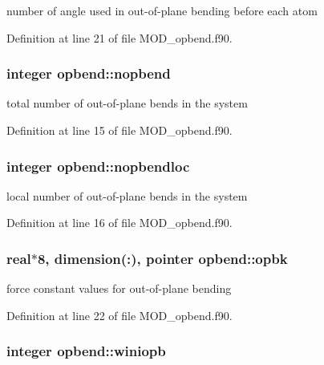 number of angle used in out-\/of-\/plane bending before each atom 



Definition at line 21 of file M\-O\-D\-\_\-opbend.\-f90.

\hypertarget{classopbend_ad0f7b4a83e73f1dc6ff0c96122c2cc83}{
\subsubsection[{nopbend}]{\setlength{\rightskip}{0pt plus 5cm}integer opbend\-::nopbend}}\label{classopbend_ad0f7b4a83e73f1dc6ff0c96122c2cc83}


total number of out-\/of-\/plane bends in the system 



Definition at line 15 of file M\-O\-D\-\_\-opbend.\-f90.

\hypertarget{classopbend_a835913f8c85f8b8af5bd6299d3ff7b1f}{
\subsubsection[{nopbendloc}]{\setlength{\rightskip}{0pt plus 5cm}integer opbend\-::nopbendloc}}\label{classopbend_a835913f8c85f8b8af5bd6299d3ff7b1f}


local number of out-\/of-\/plane bends in the system 



Definition at line 16 of file M\-O\-D\-\_\-opbend.\-f90.

\hypertarget{classopbend_a213b344234ce31a51b65aa619612a1ad}{
\subsubsection[{opbk}]{\setlength{\rightskip}{0pt plus 5cm}real$\ast$8, dimension(\-:), pointer opbend\-::opbk}}\label{classopbend_a213b344234ce31a51b65aa619612a1ad}


force constant values for out-\/of-\/plane bending 



Definition at line 22 of file M\-O\-D\-\_\-opbend.\-f90.

\hypertarget{classopbend_a6e063018cd228d297b843bdc4cd4ca2e}{
\subsubsection[{winiopb}]{\setlength{\rightskip}{0pt plus 5cm}integer opbend\-::winiopb}}\label{classopbend_a6e063018cd228d297b843bdc4cd4ca2e}


